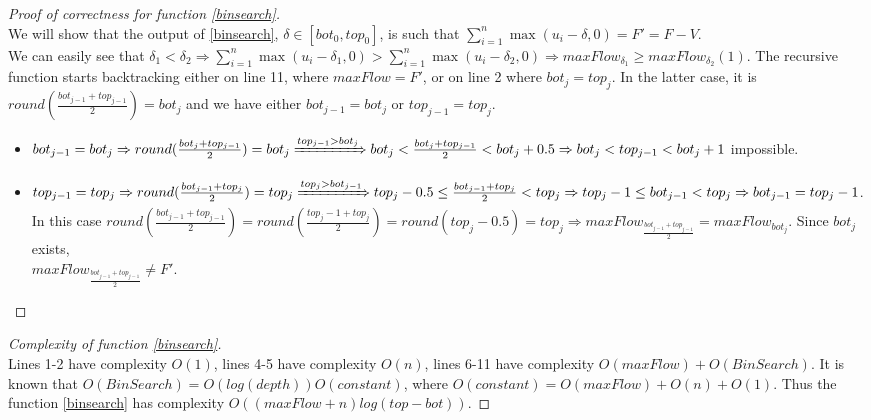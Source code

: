 \documentclass[11pt]{article}
\theoremstyle{definition}
\theoremstyle{corollary}
\begin{document}
    \begin{proof}[Proof of correctness for function \ref{binsearch}] \ \\
       We will show that the output of \ref{binsearch}, $\delta \in [bot_0, top_0]$, is such that
       $\sum\limits_{i=1}^{n}\max{(u_i - \delta, 0)} = F' = F - V$. \\
       We can easily see that $\delta_1 < \delta_2 \Rightarrow \sum\limits_{i=1}^{n}\max{(u_i - \delta_1, 0)} >
       \sum\limits_{i=1}^{n}\max{(u_i - \delta_2, 0)} \Rightarrow maxFlow_{\delta_1} \geq maxFlow_{\delta_2} (1)$.
       The recursive function starts backtracking either on line 11, where $maxFlow = F'$, or on line 2 where $bot_j=top_j$.
       In the latter case, it is $round(\frac{bot_{j-1}+top_{j-1}}{2}) = bot_j$ and we have either $bot_{j-1} = bot_j$ or $top_{j-1} = top_j$.
       \begin{itemize}
          \item $bot_{j-1} = bot_j \Rightarrow round(\frac{bot_j + top_{j-1}}{2}) = bot_j \xRightarrow{top_{j-1} > bot_j}
          bot_j < \frac{bot_j + top_{j-1}}{2} < bot_j + 0.5 \Rightarrow bot_j < top_{j-1} < bot_j + 1$ impossible.
          \item $top_{j-1} = top_j \Rightarrow round(\frac{bot_{j-1} + top_j}{2}) = top_j \xRightarrow{top_j > bot_{j-1}}
          top_j - 0.5 \leq \frac{bot_{j-1} + top_j}{2} < top_j \Rightarrow top_j - 1 \leq bot_{j-1} < top_j
          \Rightarrow bot_{j-1} = top_j - 1$. In this case $round(\frac{bot_{j-1} + top_{j-1}}{2}) =
          round(\frac{top_j - 1 + top_j}{2}) = round(top_j - 0.5) = top_j \Rightarrow
          maxFlow_{\frac{bot_{j-1} + top_{j-1}}{2}} = maxFlow_{bot_j}$. Since $bot_j$ exists, \\
          $maxFlow_{\frac{bot_{j-1} + top_{j-1}}{2}} \neq F'$.
       \end{itemize}
       
    \end{proof}
    \begin{proof}[Complexity of function \ref{binsearch}] \ \\
       Lines 1-2 have complexity $O(1)$, lines 4-5 have complexity $O(n)$, lines 6-11 have complexity
       $O(maxFlow) + O(BinSearch)$. It is known that $O(BinSearch) = O(log(depth))O(constant)$, where $O(constant) =
       O(maxFlow) + O(n) + O(1)$. Thus the function \ref{binsearch} has complexity $O((maxFlow +n)log(top-bot))$.
    \end{proof}
    
\end{document}
